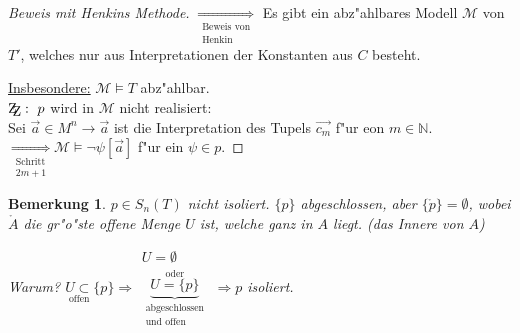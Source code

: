 \documentclass[a4paper,12pt,numbers=noenddot,parskip=full]{scrartcl}
\newcommand{\setN}{\mathbb{N}}
\newcommand{\zz}{\mathrm{Z\kern-.3em\raise-0.5ex\hbox{Z}}:~}
\theoremstyle{dotless}
\newtheorem{remark}[theorem]{Bemerkung}
\begin{document}
\begin{proof}[Beweis mit Henkins Methode]
	$\underset{\substack{\text{Beweis von}\\\text{Henkin}}}{\Longrightarrow}$ Es gibt ein abz"ahlbares Modell $\mathcal{M}$ von $T'$, welches nur aus Interpretationen der Konstanten aus $C$ besteht.
	
	\underline{Insbesondere:} $\mathcal{M} \models T$ abz"ahlbar.\\
	$\zz p$ wird in $\mathcal{M}$ nicht realisiert:\\
	Sei $\vec{a} \in M^n \rightarrow \vec{a}$ ist die Interpretation des Tupels $\vec{c_m}$ f"ur eon $m \in \setN$.\\
	$\underset{\substack{\text{Schritt}\\ 2m+1}}{\Longrightarrow} \mathcal{M} \models \lnot \psi[\vec{a}]$ f"ur ein $\psi \in p$.
\end{proof}

\begin{remark}
	$p \in S_n (T)$ nicht isoliert. $\{p\}$ abgeschlossen, aber $\{\mathring{p} \} = \emptyset$, wobei $\mathring{A}$ die gr"o"ste offene Menge $U$ ist, welche ganz in $A$ liegt. (das Innere von $A$)
	
	\emph{Warum?} $\underset{\text{offen}}{U \subset} \{p\} \Longrightarrow \begin{array}{c}
		U = \emptyset\\
		\overset{\text{oder}}{\underbrace{U = \{p\}}_{\substack{\text{abgeschlossen}\\\text{und offen}}}} 
	\end{array}\Longrightarrow p$ isoliert.
\end{remark}
\newpage
\end{document}
